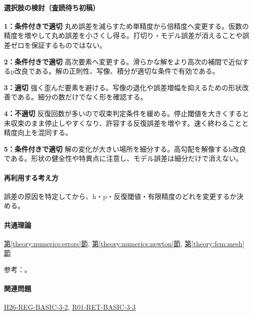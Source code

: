 \paragraph{選択肢の検討（査読待ち初稿）}\mbox{}\par

\noindent\textbf{1：条件付きで適切} 丸め誤差を減らすため単精度から倍精度へ変更する。仮数の精度を増やして丸め誤差を小さくし得る。打切り・モデル誤差が消えることや誤差ゼロを保証するものではない。\par

\noindent\textbf{2：条件付きで適切} 高次要素へ変更する。滑らかな解をより高次の補間で近似するp改良である。解の正則性、写像、積分が適切な条件で有効である。\par

\noindent\textbf{3：適切} 強く歪んだ要素を避ける。写像の退化や誤差増幅を抑えるための形状改善である。細分の数だけでなく形を確認する。\par

\noindent\textbf{4：不適切} 反復回数が多いので収束判定条件を緩める。停止閾値を大きくすると未収束のまま停止しやすくなり、許容する反復誤差を増やす。速く終わることと精度向上を混同する。\par

\noindent\textbf{5：条件付きで適切} 解の変化が大きい場所を細分する。高勾配を解像するh改良である。形状の健全性や特異点に注意し、モデル誤差は細分だけで消えない。\par

\paragraph{再利用する考え方} 誤差の原因を特定してから、h・p・反復閾値・有限精度のどれを変更するか決める。

\paragraph{共通理論} \hyperref[theory:numerics:errors]{第\ref*{theory:numerics:errors}節}, \hyperref[theory:numerics:newton]{第\ref*{theory:numerics:newton}節}, \hyperref[theory:fem:mesh]{第\ref*{theory:fem:mesh}節}

\par 参考：\cite{mit_roy_fea1999,goldberg1991,nist_newton}。

\paragraph{関連問題} \hyperref[q:h26-reg-basic-3-2]{H26-REG-BASIC-3-2}, \hyperref[q:r01-ret-basic-3-3]{R01-RET-BASIC-3-3}

